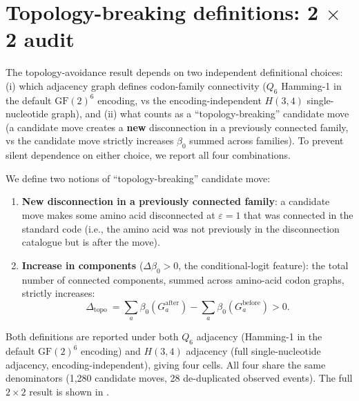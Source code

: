 \documentclass[preprint,11pt,authoryear,a4paper]{elsarticle}
\begin{document}
\section{Topology-breaking definitions: 2 \ensuremath{\times} 2
audit}\label{sec:s-topology-defs}

The topology-avoidance result depends on two independent definitional
choices: (i) which adjacency graph defines codon-family connectivity
(\(Q_{6}\) Hamming-1 in the default \({\text{GF}(2)}^{6}\) encoding, vs
the encoding-independent \(H(3,4)\) single-nucleotide graph), and (ii)
what counts as a ``topology-breaking'' candidate move (a candidate move
creates a \textbf{new} disconnection in a previously connected family,
vs the candidate move strictly increases \(\beta_{0}\) summed across
families). To prevent silent dependence on either choice, we report all
four combinations.

We define two notions of ``topology-breaking'' candidate move:

\begin{enumerate}
\item
  \textbf{New disconnection in a previously connected family}: a
  candidate move makes some amino acid disconnected at
  \(\varepsilon = 1\) that was connected in the standard code (i.e., the
  amino acid was not previously in the disconnection catalogue but is
  after the move).
\item
  \textbf{Increase in components} (\(\Delta\beta_{0} > 0\), the
  conditional-logit feature): the total number of connected components,
  summed across amino-acid codon graphs, strictly increases:
  \[\Delta_{\text{topo }} = \sum_{a}\beta_{0}\left( G_{a}^{\text{after}} \right) - \sum_{a}\beta_{0}\left( G_{a}^{\text{before}} \right) > 0.\]
\end{enumerate}

Both definitions are reported under both \(Q_{6}\) adjacency (Hamming-1
in the default \({\text{GF}(2)}^{6}\) encoding) and \(H(3,4)\) adjacency
(full single-nucleotide adjacency, encoding-independent), giving four
cells. All four share the same denominators (1,280 candidate moves, 28
de-duplicated observed events). The full \(2 \times 2\) result is shown
in .
\end{document}
